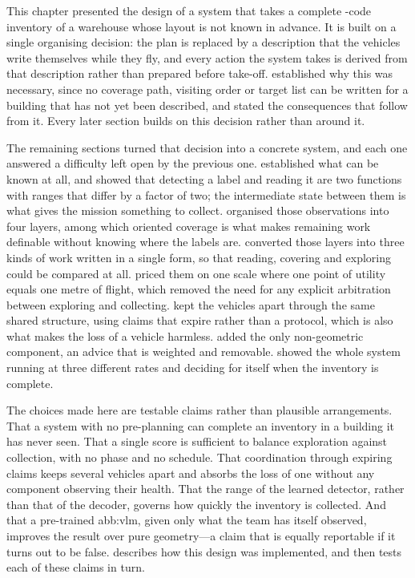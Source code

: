 This chapter presented the design of a system that takes a complete
-code inventory of a warehouse whose layout is not known in
advance. It is built on a single organising decision: the plan is replaced by a
description that the vehicles write themselves while they fly, and every action
the system takes is derived from that description rather than prepared before
take-off.  established why this was necessary, since no
coverage path, visiting order or target list can be written for a building that
has not yet been described, and  stated the consequences
that follow from it. Every later section builds on this decision rather than
around it.

The remaining sections turned that decision into a concrete system, and each one
answered a difficulty left open by the previous one.
 established what can be known at all, and showed
that detecting a label and reading it are two functions with ranges that differ
by a factor of two; the intermediate state between them is what gives the mission
something to collect.  organised those observations into
four layers, among which oriented coverage is what makes remaining work definable
without knowing where the labels are.  converted those
layers into three kinds of work written in a single form, so that reading,
covering and exploring could be compared at all.  priced
them on one scale where one point of utility equals one metre of flight, which
removed the need for any explicit arbitration between exploring and collecting.
 kept the vehicles apart through the same shared structure,
using claims that expire rather than a protocol, which is also what makes the
loss of a vehicle harmless.  added the only
non-geometric component, an advice that is weighted and removable.
 showed the whole system running at three different rates
and deciding for itself when the inventory is complete.

The choices made here are testable claims rather than plausible arrangements.
That a system with no pre-planning can complete an inventory in a building it has
never seen. That a single score is sufficient to balance exploration against
collection, with no phase and no schedule. That coordination through expiring
claims keeps several vehicles apart and absorbs the loss of one without any
component observing their health. That the range of the learned detector, rather
than that of the decoder, governs how quickly the inventory is collected. And
that a pre-trained \gls{abb:vlm}, given only what the team has itself observed,
improves the result over pure geometry---a claim that is equally reportable if it
turns out to be false.  describes how this design was
implemented, and then tests each of these claims in turn.
